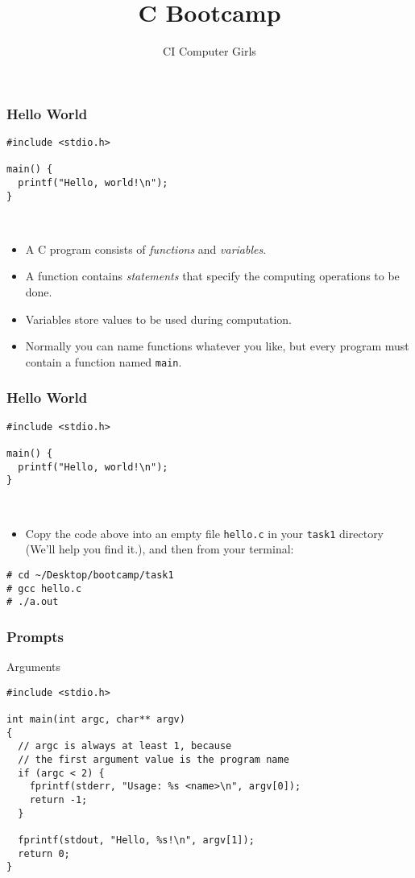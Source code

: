 \documentclass[pdf]{beamer}
\title{C Bootcamp}
\author{CI Computer Girls}
\begin{document}
\begin{frame}
  \titlepage%
\end{frame}

\begin{frame}[fragile]
  \frametitle{Hello World}

\begin{verbatim}
#include <stdio.h>

main() {
  printf("Hello, world!\n");
}
\end{verbatim}
\\
  \begin{itemize}
  \item A C program consists of \textit{functions} and \textit{variables}.
    \pause
  \item A function contains \textit{statements} that specify the
    computing operations to be done.
    \pause
  \item Variables store values to be used during computation.
    \pause
  \item Normally you can name functions whatever you like, but every program
    must contain a function named \texttt{main}.
  \end{itemize}
\end{frame}

\begin{frame}[fragile]
  \frametitle{Hello World}

\begin{verbatim}
#include <stdio.h>

main() {
  printf("Hello, world!\n");
}
\end{verbatim}
\\
  \begin{itemize}
  \item Copy the code above into an empty file \texttt{hello.c} in your
    \texttt{task1} directory (We'll help you find it.), and then from your
    terminal:
    \pause
  \end{itemize}
\bigskip
\begin{verbatim}
# cd ~/Desktop/bootcamp/task1
# gcc hello.c
# ./a.out
\end{verbatim}

\end{frame}

\begin{frame}
\frametitle{Prompts}

\end{frame}

\begin{frame}[fragile]{Arguments}

\begin{verbatim}
#include <stdio.h>

int main(int argc, char** argv)
{
  // argc is always at least 1, because
  // the first argument value is the program name
  if (argc < 2) {
    fprintf(stderr, "Usage: %s <name>\n", argv[0]);
    return -1;
  }

  fprintf(stdout, "Hello, %s!\n", argv[1]);
  return 0;
}
\end{verbatim}

\end{frame}
\end{document}
